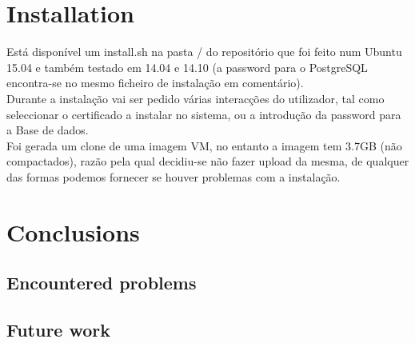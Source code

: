 \documentclass[11pt,a4paper]{report}
\begin{document}
\chapter{Installation}

Está disponível um install.sh na pasta / do repositório que foi feito num Ubuntu 15.04 e também testado em 14.04 e 14.10 (a password para o PostgreSQL encontra-se no mesmo ficheiro de instalação em comentário).\\

Durante a instalação vai ser pedido várias interacções do utilizador, tal como seleccionar o certificado a instalar no sistema, ou a introdução da password para a Base de dados.\\

Foi gerada um clone de uma imagem VM, no entanto a imagem tem 3.7GB (não compactados), razão pela qual decidiu-se não fazer upload da mesma, de qualquer das formas podemos fornecer se houver problemas com a instalação.

\chapter{Conclusions}
\section{Encountered problems}
\section{Future work}





\end{document}
